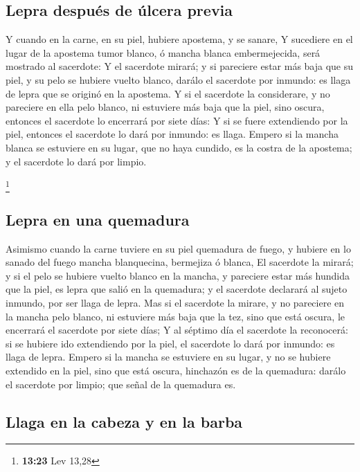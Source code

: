 \hypertarget{lepra-despuuxe9s-de-uxfalcera-previa}{%
\subsection{Lepra después de úlcera
previa}\label{lepra-despuuxe9s-de-uxfalcera-previa}}

 Y cuando en la carne, en su piel, hubiere apostema, y se
sanare,  Y sucediere en el lugar de la apostema tumor
blanco, ó mancha blanca embermejecida, será mostrado al sacerdote:
 Y el sacerdote mirará; y si pareciere estar más baja que
su piel, y su pelo se hubiere vuelto blanco, darálo el sacerdote por
inmundo: es llaga de lepra que se originó en la apostema. 
Y si el sacerdote la considerare, y no pareciere en ella pelo blanco, ni
estuviere más baja que la piel, sino oscura, entonces el sacerdote lo
encerrará por siete días:  Y si se fuere extendiendo por la
piel, entonces el sacerdote lo dará por inmundo: es llaga. 
Empero si la mancha blanca se estuviere en su lugar, que no haya
cundido, es la costra de la apostema; y el sacerdote lo dará por limpio.

\footnote{\textbf{13:23} Lev 13,28}

\hypertarget{lepra-en-una-quemadura}{%
\subsection{Lepra en una quemadura}\label{lepra-en-una-quemadura}}

 Asimismo cuando la carne tuviere en su piel quemadura de
fuego, y hubiere en lo sanado del fuego mancha blanquecina, bermejiza ó
blanca,  El sacerdote la mirará; y si el pelo se hubiere
vuelto blanco en la mancha, y pareciere estar más hundida que la piel,
es lepra que salió en la quemadura; y el sacerdote declarará al sujeto
inmundo, por ser llaga de lepra.  Mas si el sacerdote la
mirare, y no pareciere en la mancha pelo blanco, ni estuviere más baja
que la tez, sino que está oscura, le encerrará el sacerdote por siete
días;  Y al séptimo día el sacerdote la reconocerá: si se
hubiere ido extendiendo por la piel, el sacerdote lo dará por inmundo:
es llaga de lepra.  Empero si la mancha se estuviere en su
lugar, y no se hubiere extendido en la piel, sino que está oscura,
hinchazón es de la quemadura: darálo el sacerdote por limpio; que señal
de la quemadura es.

\hypertarget{llaga-en-la-cabeza-y-en-la-barba}{%
\subsection{Llaga en la cabeza y en la
barba}\label{llaga-en-la-cabeza-y-en-la-barba}}


